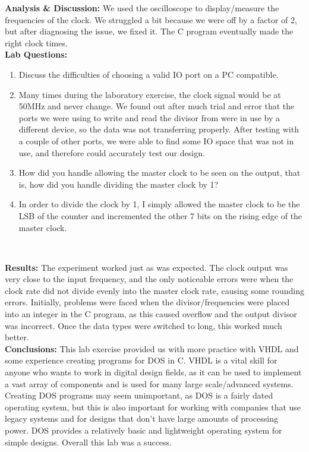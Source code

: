\documentclass{article}
\newcommand{\Q}{\textbf{Q:}}
\newcommand{\A}{\textbf{A:}}
\newcommand{\sect}[1]{\noindent\textbf{#1}}
\begin{document}
\sect{Analysis \& Discussion:} We used the oscilloscope to display/measure the frequencies of the clock. We struggled a bit because we were off by a factor of 2, but after diagnosing the issue, we fixed it. The C program eventually made the right clock times.\\

\sect{Lab Questions:}

\begin{enumerate}
	\item[\Q] Discuss the difficulties of choosing a valid IO port on a PC compatible.
	\item[\A] Many times during the laboratory exercise, the clock signal would be at 50MHz and never change. We found out after much trial and error that the ports we were using to write and read the divisor from were in use by a different device, so the data was not transferring properly. After testing with a couple of other ports, we were able to find some IO space that was not in use, and therefore could accurately test our design.
	\item[\Q] How did you handle allowing the master clock to be seen on the output, that is, how did you handle dividing the master clock by 1?
	\item[\A] In order to divide the clock by 1, I simply allowed the master clock to be the LSB of the counter and incremented the other 7 bits on the rising edge of the master clock. 
\end{enumerate}~

\sect{Results:} The experiment worked just as was expected. The clock output was very close to the input frequency, and the only noticeable errors were when the clock rate did not divide evenly into the master clock rate, causing some rounding errors. Initially, problems were faced when the divisor/frequencies were placed into an integer in the C program, as this caused overflow and the output divisor was incorrect. Once the data types were switched to long, this worked much better.\\

\sect{Conclusions:} This lab exercise provided us with more practice with VHDL and some experience creating programs for DOS in C. VHDL is a vital skill for anyone who wants to work in digital design fields, as it can be used to implement a vast array of components and is used for many large scale/advanced systems. Creating DOS programs may seem unimportant, as DOS is a fairly dated operating system, but this is also important for working with companies that use legacy systems and for designs that don't have large amounts of processing power. DOS provides a relatively basic and lightweight operating system for simple designs. Overall this lab was a success.
\end{document}
